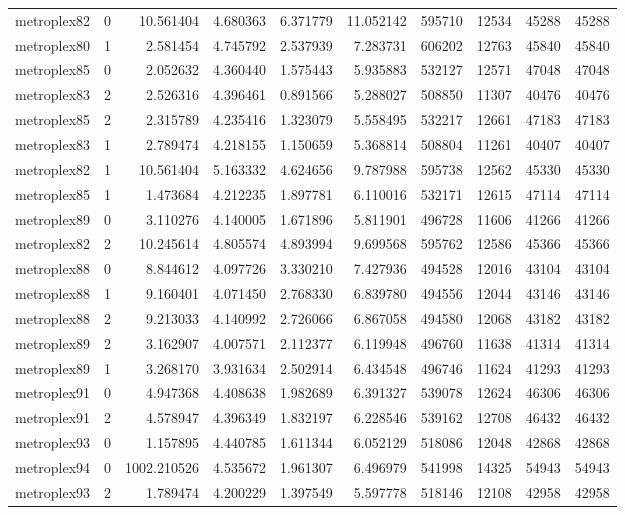 \begin{longtable}{|l|r|r|r|r|r|r|r|r|r|}
metroplex82 & 0 & 10.561404 & 4.680363 & 6.371779 & 11.052142 & 595710 & 12534 & 45288 & 45288 \\
metroplex80 & 1 & 2.581454 & 4.745792 & 2.537939 & 7.283731 & 606202 & 12763 & 45840 & 45840 \\
metroplex85 & 0 & 2.052632 & 4.360440 & 1.575443 & 5.935883 & 532127 & 12571 & 47048 & 47048 \\
metroplex83 & 2 & 2.526316 & 4.396461 & 0.891566 & 5.288027 & 508850 & 11307 & 40476 & 40476 \\
metroplex85 & 2 & 2.315789 & 4.235416 & 1.323079 & 5.558495 & 532217 & 12661 & 47183 & 47183 \\
metroplex83 & 1 & 2.789474 & 4.218155 & 1.150659 & 5.368814 & 508804 & 11261 & 40407 & 40407 \\
metroplex82 & 1 & 10.561404 & 5.163332 & 4.624656 & 9.787988 & 595738 & 12562 & 45330 & 45330 \\
metroplex85 & 1 & 1.473684 & 4.212235 & 1.897781 & 6.110016 & 532171 & 12615 & 47114 & 47114 \\
metroplex89 & 0 & 3.110276 & 4.140005 & 1.671896 & 5.811901 & 496728 & 11606 & 41266 & 41266 \\
metroplex82 & 2 & 10.245614 & 4.805574 & 4.893994 & 9.699568 & 595762 & 12586 & 45366 & 45366 \\
metroplex88 & 0 & 8.844612 & 4.097726 & 3.330210 & 7.427936 & 494528 & 12016 & 43104 & 43104 \\
metroplex88 & 1 & 9.160401 & 4.071450 & 2.768330 & 6.839780 & 494556 & 12044 & 43146 & 43146 \\
metroplex88 & 2 & 9.213033 & 4.140992 & 2.726066 & 6.867058 & 494580 & 12068 & 43182 & 43182 \\
metroplex89 & 2 & 3.162907 & 4.007571 & 2.112377 & 6.119948 & 496760 & 11638 & 41314 & 41314 \\
metroplex89 & 1 & 3.268170 & 3.931634 & 2.502914 & 6.434548 & 496746 & 11624 & 41293 & 41293 \\
metroplex91 & 0 & 4.947368 & 4.408638 & 1.982689 & 6.391327 & 539078 & 12624 & 46306 & 46306 \\
metroplex91 & 2 & 4.578947 & 4.396349 & 1.832197 & 6.228546 & 539162 & 12708 & 46432 & 46432 \\
metroplex93 & 0 & 1.157895 & 4.440785 & 1.611344 & 6.052129 & 518086 & 12048 & 42868 & 42868 \\
metroplex94 & 0 & 1002.210526 & 4.535672 & 1.961307 & 6.496979 & 541998 & 14325 & 54943 & 54943 \\
metroplex93 & 2 & 1.789474 & 4.200229 & 1.397549 & 5.597778 & 518146 & 12108 & 42958 & 42958 \\

\end{longtable}
